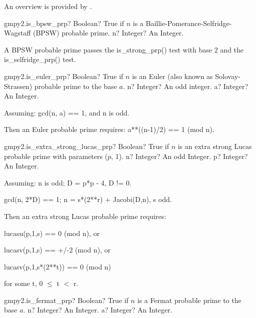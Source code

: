 An overview is provided by \cite{Grantham_2001}.

\vspace{0.6cm}
\begin{mpFunctionsExtract}
	\mpFunctionOne
	{gmpy2.is\_bpsw\_prp? Boolean? True if $n$ is a Baillie-Pomerance-Selfridge-Wagstaff (BPSW) probable prime.}
	{n? Integer? An Integer.}
\end{mpFunctionsExtract}

\vspace{0.3cm}
A BPSW probable prime passes the is\_strong\_prp() test with base 2 and the is\_selfridge\_prp() test.


\vspace{0.6cm}
\begin{mpFunctionsExtract}
	\mpFunctionTwo
	{gmpy2.is\_euler\_prp? Boolean? True if $n$ is an Euler (also known as Solovay-Strassen) probable prime to the base $a$.}
	{n? Integer? An odd integer.}
	{a? Integer? An Integer.}
\end{mpFunctionsExtract}

\vspace{0.3cm}

Assuming: gcd(n, a) == 1, and n is odd.

Then an Euler probable prime requires: a**((n-1)/2) == 1 (mod n).


\vspace{0.6cm}
\begin{mpFunctionsExtract}
	\mpFunctionTwo
	{gmpy2.is\_extra\_strong\_lucas\_prp? Boolean? True if $n$ is an extra strong Lucas probable prime with parameters ($p$, 1).}
	{n? Integer? An odd Integer.}
	{p? Integer? An Integer.}
\end{mpFunctionsExtract}

\vspace{0.3cm}
Assuming: n is odd; D = p*p - 4, D != 0.

gcd(n, 2*D) == 1; n = s*(2**r) + Jacobi(D,n), s odd.

\vpara
Then an extra strong Lucas probable prime requires:

lucasu(p,1,s) == 0 (mod n), or

lucasv(p,1,s) == +/-2 (mod n), or

lucasv(p,1,s*(2**t)) == 0 (mod n) 

for some t, 0 $\le$ t $<$ r.




\vspace{0.6cm}
\begin{mpFunctionsExtract}
	\mpFunctionTwo
	{gmpy2.is\_fermat\_prp? Boolean? True if $n$ is a Fermat probable prime to the base $a$.}
	{n? Integer? An Integer.}
	{a? Integer? An Integer.}
\end{mpFunctionsExtract}

